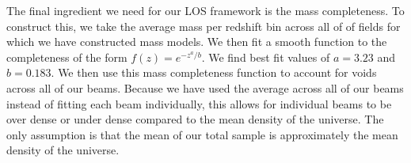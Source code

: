 The final ingredient we need for our LOS framework is the mass completeness. To construct this, we take the average mass per redshift bin across all of of fields for which we have constructed mass models. We then fit a smooth function to the completeness of the form $f(z) = e^{-z^a / b}$. We find best fit values of $a = 3.23$ and $b = 0.183$. We then use this mass completeness function to account for voids across all of our beams. Because we have used the average across all of our beams instead of fitting each beam individually, this allows for individual beams to be over dense or under dense compared to the mean density of the universe. The only assumption is that the mean of our total sample is approximately the mean density of the universe.  
  